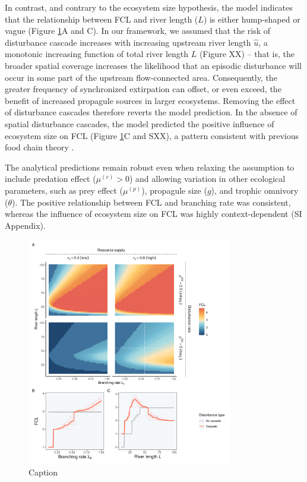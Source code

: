 \documentclass[11pt, class=article, crop=false]{standalone}
\begin{document}
In contrast, and contrary to the ecosystem size hypothesis, the model indicates that the relationship between FCL and river length ($L$) is either hump-shaped or vague (Figure \ref{fig:sim-main}A and C).
In our framework, we assumed that the risk of disturbance cascade increases with increasing upstream river length $\hat{u}$, a monotonic increasing function of total river length $L$ (Figure XX) -- that is, the broader spatial coverage increases the likelihood that an episodic disturbance will occur in some part of the upstream flow-connected area.
Consequently, the greater frequency of synchronized extirpation can offset, or even exceed, the benefit of increased propagule sources in larger ecosystems.
Removing the effect of disturbance cascades therefore reverts the model prediction. 
In the absence of spatial disturbance cascades, the model predicted the positive influence of ecosystem size on FCL (Figure \ref{fig:sim-main}C and SXX), a pattern consistent with previous food chain theory \citep{holt_food_2002, takimoto_effects_2012, terui_spatial_2019, guo_towards_2023}.

The analytical predictions remain robust even when relaxing the assumption to include predation effect ($\mu^{(c)} > 0$) and allowing variation in other ecological parameters, such as prey effect ($\mu^{(p)}$), propagule size ($g$), and trophic omnivory ($\theta$).
The positive relationship between FCL and branching rate was consistent, whereas the influence of ecosystem size on FCL was highly context-dependent (SI Appendix).

\begin{figure}
    \centering
    \includegraphics[width=0.8\textwidth]{output/fig_sim_main.pdf}
    \caption{Caption}
    \label{fig:sim-main}
\end{figure}
\end{document}
